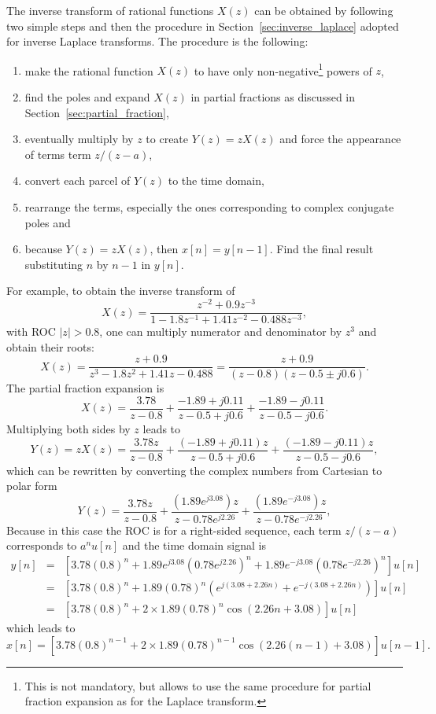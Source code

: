 The inverse transform of rational functions $X(z)$ can be obtained by following two simple steps and then the 
procedure in Section~\ref{sec:inverse_laplace} adopted for inverse Laplace transforms. The procedure is the following:
\begin{enumerate}
        \item make the rational function $X(z)$ to have only non-negative\footnote{This is not mandatory, but allows to use the same procedure for partial fraction expansion as for the Laplace transform.} powers of $z$,
        \item find the poles and expand $X(z)$ in partial fractions as discussed in Section~\ref{sec:partial_fraction},
        \item eventually multiply by $z$ to create $Y(z)=z X(z)$ and force the appearance of terms term $z/(z-a)$,
        \item convert each parcel of $Y(z)$ to the time domain,
        \item rearrange the terms, especially the ones corresponding to complex conjugate poles and
        \item because $Y(z)=z X(z)$, then $x[n]=y[n-1]$. Find the final result substituting $n$ by $n-1$ in $y[n]$.
\end{enumerate}
For example, to obtain the inverse transform of
\[
X(z) = \frac{z^{-2} + 0.9 z^{-3}}{1 - 1.8z^{-1} + 1.41 z^{-2}- 0.488 z^{-3}},
\]
with ROC $|z|>0.8$, one can multiply numerator and denominator by $z^3$ and obtain their roots:
\[
X(z) = \frac{z + 0.9}{z^3 - 1.8z^2 + 1.41 z - 0.488}=\frac{z+0.9}{(z-0.8)(z-0.5 \pm j0.6)}.
\]
The partial fraction expansion is
\[
X(z) = \frac{3.78}{z-0.8} + \frac{-1.89+j0.11}{z-0.5+j0.6} + \frac{-1.89-j0.11}{z-0.5-j0.6}.
\]
Multiplying both sides by $z$ leads to
\[
Y(z) = z X(z) = \frac{3.78z}{z-0.8} + \frac{(-1.89+j0.11)z}{z-0.5+j0.6} + \frac{(-1.89-j0.11)z}{z-0.5-j0.6},
\]
which can be rewritten by converting the complex numbers from Cartesian to polar form
\[
Y(z) = \frac{3.78z}{z-0.8} + \frac{(1.89e^{j3.08})z}{z-0.78e^{j2.26}} + \frac{(1.89e^{-j3.08})z}{z-0.78e^{-j2.26}},
\]
Because in this case the ROC is for a right-sided sequence, each term $z/(z-a)$ corresponds to $a^n u[n]$ and the time domain signal is
\begin{eqnarray*}
y[n] & = &[3.78 (0.8)^n+1.89e^{j3.08} (0.78e^{j2.26})^n + 1.89e^{-j3.08} (0.78e^{-j2.26})^n] u[n] \\
           & = &[3.78 (0.8)^n + 1.89  (0.78)^n (e^{j(3.08+2.26n)}+e^{-j(3.08+2.26n)}) ] u[n]\\
           & = &[3.78 (0.8)^n + 2 \times 1.89 (0.78)^n \cos(2.26n+3.08)] u[n]
\end{eqnarray*}
which leads to
\[
x[n] = [3.78 (0.8)^{n-1} + 2 \times 1.89 (0.78)^{n-1} \cos(2.26(n-1)+3.08)] u[n-1].
\]

